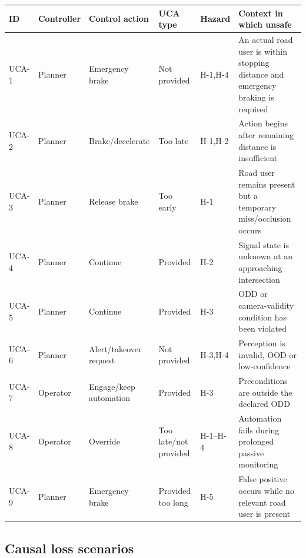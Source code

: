 \documentclass[nologo,a4paper,12pt]{article}
\begin{document}
{\scriptsize
\begin{tabularx}{\linewidth}{@{}p{1.0cm}p{1.5cm}p{2.1cm}p{1.6cm}p{1.25cm}Y@{}}
\toprule
\textbf{ID} & \textbf{Controller} & \textbf{Control action} & \textbf{UCA type} & \textbf{Hazard} & \textbf{Context in which unsafe} \\
\midrule
UCA-1 & Planner & Emergency brake & Not provided & H-1,H-4 & An actual road user is within stopping distance and emergency braking is required \\
UCA-2 & Planner & Brake/decelerate & Too late & H-1,H-2 & Action begins after remaining distance is insufficient \\
UCA-3 & Planner & Release brake & Too early & H-1 & Road user remains present but a temporary miss/occlusion occurs \\
UCA-4 & Planner & Continue & Provided & H-2 & Signal state is unknown at an approaching intersection \\
UCA-5 & Planner & Continue & Provided & H-3 & ODD or camera-validity condition has been violated \\
UCA-6 & Planner & Alert/takeover request & Not provided & H-3,H-4 & Perception is invalid, OOD or low-confidence \\
UCA-7 & Operator & Engage/keep automation & Provided & H-3 & Preconditions are outside the declared ODD \\
UCA-8 & Operator & Override & Too late/not provided & H-1--H-4 & Automation fails during prolonged passive monitoring \\
UCA-9 & Planner & Emergency brake & Provided too long & H-5 & False positive occurs while no relevant road user is present \\
\bottomrule
\end{tabularx}}

\subsection{Causal loss scenarios}
\end{document}
